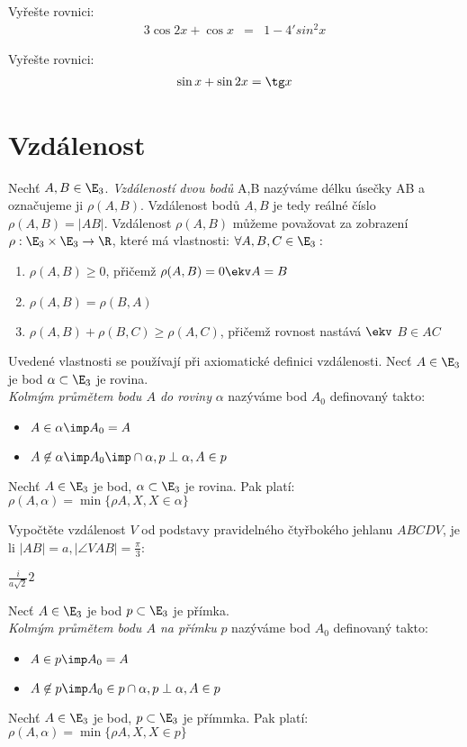 
\let\braceru=\relax \let\bracelu=\relax 
\def\o#1{\setbox0=
	\hbox{$\kern2pt\overbrace{\kern-2pt#1\kern-2pt}\kern2pt$}\ht0=2.1ex\box0}
\def\to#1{\hbox{#1\rlap{\t{}}}}
\def\rad{\rm{rad}}
\def\f{\frac}

\Pr Vyřešte rovnici:
\begin{eqnarray*}
	3 \cos 2x + \cos x &=& 1-4'sin^2 x
\end{eqnarray*}

\Pr Vyřešte rovnici:
\begin{eqnarray*}
	\sin x + \sin 2x = \tg x
\end{eqnarray*}
\section{Vzdálenost}
\Def Nechť $A,B \in \E_3$. \emph{Vzdáleností dvou bodů} A,B nazýváme délku úsečky AB a označujeme ji $\rho(A,B)$.
\Poz
Vzdálenost bodů $A,B$ je tedy reálné číslo $\rho(A,B) = |AB|$.
\Poz
Vzdálenost $\rho(A,B)$ můžeme považovat za zobrazení $\rho: \E_3\times\E_3 \rightarrow \R$, které má vlastnosti:
$\forall A,B,C \in \E_3:$
\begin{enumerate}
	\item $\rho(A,B) \ge 0$, přičemž $\rho(A,B) = 0 \ekv A=B$
	\item $\rho(A,B)=\rho(B,A)$
	\item $\rho(A,B) + \rho(B,C) \ge \rho(A,C)$, přičemž rovnost nastává $\ekv$ $B\in AC$
\end{enumerate}
\Poz Uvedené vlastnosti se používají při axiomatické definici vzdálenosti.
\Def
Necť $A\in\E_3$ je bod $\alpha\subset \E_3$ je rovina.\\
\emph{Kolmým průmětem bodu $A$ do roviny} $\alpha$ nazýváme bod $A_0$ definovaný takto:
\begin{itemize}
\item $A\in\alpha \imp A_0=A$
\item $A\not\in\alpha \imp A_0\imp\cap\alpha, p\perp\alpha , A\in p$
\end{itemize}
\V Nechť $A\in\E_3$ je bod, $\alpha\subset\E_3$ je rovina. Pak platí:
$\rho (A,\alpha) = \min\{\rho{A,X},X\in\alpha\}$

\Pr Vypočtěte vzdálenost $V$ od podstavy pravidelného čtyřbokého jehlanu $ABCDV$, je li $|AB|=a, |\angle VAB| = \f \pi 3$:

$\f i{a\sqrt 2} 2 $

\Def
Necť $A\in\E_3$ je bod $p\subset \E_3$ je přímka.\\
\emph{Kolmým průmětem bodu $A$ na přímku} $p$ nazýváme bod $A_0$ definovaný takto:
\begin{itemize}
\item $A\in p \imp A_0=A$
\item $A\not\in p \imp A_0\in p\cap\alpha, p\perp\alpha , A\in p$
\end{itemize}
\V Nechť $A\in\E_3$ je bod, $p \subset\E_3$ je přímmka. Pak platí:
$\rho (A,\alpha) = \min\{\rho{A,X},X\in p\}$

\EndDoc


